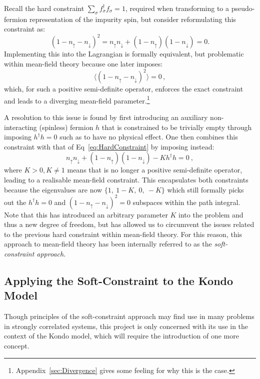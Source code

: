Recall the hard constraint $ \sum_{\sigma} f^{\dagger}_{\sigma} f^{}_{\sigma} = 1 $, required when transforming to a pseudo-fermion representation of the impurity spin, but consider reformulating this constraint as: \begin{equation} (1 - n_{\uparrow} - n_{\downarrow})^2 = n_{\uparrow} n_{\downarrow} + (1 - n_{\uparrow})(1 - n_{\downarrow}) = 0 . \label{eq:HardConstraint}\end{equation} Implementing this into the Lagrangian is formally equivalent, but problematic within mean-field theory because one later imposes: \[ \langle (1 - n_{\uparrow} - n_{\downarrow})^2 \rangle = 0\,, \] which, for such a positive semi-definite operator, enforces the exact constraint and leads to a diverging mean-field parameter.\footnote{Appendix~\ref{sec:Divergence} gives some feeling for why this is the case.}

A resolution to this issue is found by first introducing an auxiliary non-interacting (spinless) fermion $ h $ that is constrained to be trivially empty through imposing $ h^{\dagger} h = 0 $ such as to have no physical effect. One then combines this constraint with that of Eq~\eqref{eq:HardConstraint} by imposing instead:
\begin{equation} n_{\uparrow} n_{\downarrow} + (1 - n_{\uparrow})(1 - n_{\downarrow}) - K h^{\dagger} h = 0~,
\label{eq:soft_constraint}
\end{equation}
where $ K > 0, K \neq 1 $ means that is no longer a positive semi-definite operator, leading to a realisable mean-field constraint. This encapsulates both constraints because the eigenvalues are now $ \{ 1,~ 1-K,~ 0,~ -K \} $ which still formally picks out the $ h^{\dagger} h = 0 $ and $ (1 - n_{\uparrow} - n_{\downarrow})^2 = 0 $ subspaces within the path integral. Note that this has introduced an arbitrary parameter $ K $ into the problem and thus a new degree of freedom, but has allowed us to circumvent the issues related to the previous hard constraint within mean-field theory. For this reason, this approach to mean-field theory has been internally referred to as the \emph{soft-constraint approach}.

\subsection{Applying the Soft-Constraint to the Kondo Model}

Though principles of the soft-constraint approach may find use in many problems in strongly correlated systems, this project is only concerned with its use in the context of the Kondo model, which will require the introduction of one more concept.

